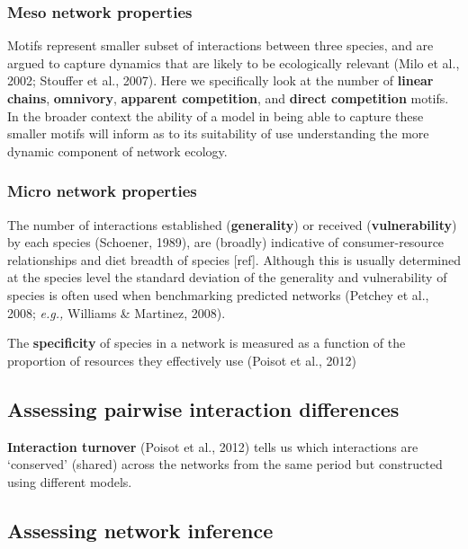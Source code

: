 \documentclass[
]{article}
\begin{document}
\subsubsection{Meso network properties}\label{meso-network-properties}

Motifs represent smaller subset of interactions between three species,
and are argued to capture dynamics that are likely to be ecologically
relevant (Milo et al., 2002; Stouffer et al., 2007). Here we
specifically look at the number of \textbf{linear chains},
\textbf{omnivory}, \textbf{apparent competition}, and \textbf{direct
competition} motifs. In the broader context the ability of a model in
being able to capture these smaller motifs will inform as to its
suitability of use understanding the more dynamic component of network
ecology.

\subsubsection{Micro network properties}\label{micro-network-properties}

The number of interactions established (\textbf{generality}) or received
(\textbf{vulnerability}) by each species (Schoener, 1989), are (broadly)
indicative of consumer-resource relationships and diet breadth of
species {[}ref{]}. Although this is usually determined at the species
level the standard deviation of the generality and vulnerability of
species is often used when benchmarking predicted networks (Petchey et
al., 2008; \emph{e.g.,} Williams \& Martinez, 2008).

The \textbf{specificity} of species in a network is measured as a
function of the proportion of resources they effectively use (Poisot et
al., 2012)

\subsection{Assessing pairwise interaction
differences}\label{assessing-pairwise-interaction-differences}

\textbf{Interaction turnover} (Poisot et al., 2012) tells us which
interactions are `conserved' (shared) across the networks from the same
period but constructed using different models.

\subsection{Assessing network
inference}\label{assessing-network-inference}
\end{document}
